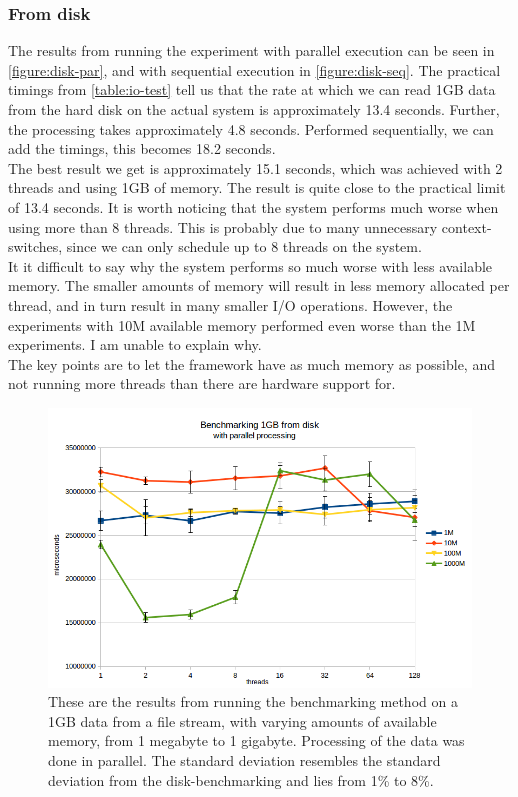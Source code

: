 \documentclass[a4paper]{article}
\begin{document}
\subsubsection{From disk}
The results from running the experiment with parallel execution can be seen in \autoref{figure:disk-par}, and with sequential execution in \autoref{figure:disk-seq}. The practical timings from \autoref{table:io-test} tell us that the rate at which we can read 1GB data from the hard disk on the actual system is approximately 13.4 seconds. Further, the processing takes approximately 4.8 seconds. Performed sequentially, we can add the timings, this becomes 18.2 seconds.\\

The best result we get is approximately 15.1 seconds, which was achieved with 2 threads and using 1GB of memory. The result is quite close to the practical limit of 13.4 seconds. It is worth noticing that the system performs much worse when using more than 8 threads. This is probably due to many unnecessary context-switches, since we can only schedule up to 8 threads on the system.\\

It it difficult to say why the system performs so much worse with less available memory. The smaller amounts of memory will result in less memory allocated per thread, and in turn result in many smaller I/O operations. However, the experiments with 10M available memory performed even worse than the 1M experiments. I am unable to explain why.\\

The key points are to let the framework have as much memory as possible, and not running more threads than there are hardware support for. 

\begin{figure}
	\begin{adjustwidth}{-0.5in}{-0.5in}
    \centering
     \includegraphics[scale=0.7]{../test_results/disk_par.png}
  	\caption{These are the results from running the benchmarking method on a 1GB data from a file stream, with varying amounts of available memory, from 1 megabyte to 1 gigabyte. Processing of the data was done in parallel. The standard deviation resembles the standard deviation from the disk-benchmarking and lies from 1\% to 8\%.}
	\label{figure:disk-par}
	\end{adjustwidth}
\end{figure}
\end{document}

